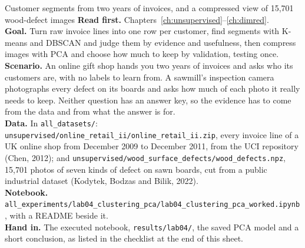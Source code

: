 
\begin{labproject}{Customer segments from two years of invoices, and a compressed view of 15,701 wood-defect images}
\textbf{Read first.} Chapters~\ref{ch:unsupervised}--\ref{ch:dimred}.\\
\textbf{Goal.} Turn raw invoice lines into one row per customer, find segments with K-means and DBSCAN and judge them by evidence and usefulness, then compress images with PCA and choose how much to keep by validation, testing once.\\
\textbf{Scenario.} An online gift shop hands you two years of invoices and asks who its customers are, with no labels to learn from. A sawmill's inspection camera photographs every defect on its boards and asks how much of each photo it really needs to keep. Neither question has an answer key, so the evidence has to come from the data and from what the answer is for.\\
\textbf{Data.} In \texttt{all\_datasets/}: \texttt{unsupervised/\allowbreak online\_retail\_ii/\allowbreak online\_retail\_ii.zip}, every invoice line of a UK online shop from December 2009 to December 2011, from the UCI repository (Chen, 2012); and \texttt{unsupervised/\allowbreak wood\_surface\_defects/\allowbreak wood\_defects.npz}, 15,701 photos of seven kinds of defect on sawn boards, cut from a public industrial dataset (Kodytek, Bodzas and Bilik, 2022).\\
\textbf{Notebook.} \texttt{all\_experiments/\allowbreak lab04\_clustering\_pca/\allowbreak lab04\_clustering\_pca\_worked.ipynb}, with a README beside it.\\
\textbf{Hand in.} The executed notebook, \texttt{results/lab04/}, the saved PCA model and a short conclusion, as listed in the checklist at the end of this sheet.
\end{labproject}


